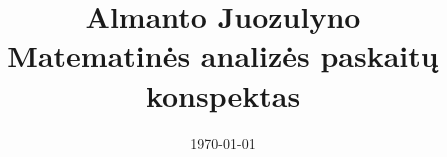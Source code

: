\documentclass{report}
\title{%
Almanto Juozulyno\\
Matematinės analizės paskaitų konspektas}
\author{}
\date{\today}
\theoremstyle{plain}
\theoremstyle{definition}
\theoremstyle{remark}
\theoremstyle{notation}
\begin{document}
\maketitle
\bigskip
\tableofcontents
\end{document}
